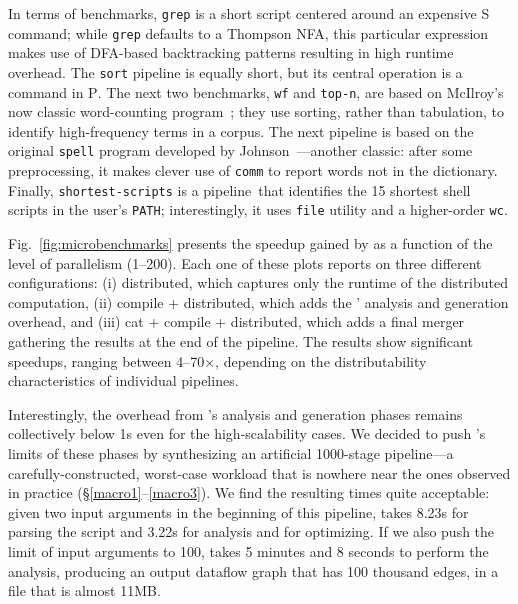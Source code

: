 \documentclass[sigplan,10pt,review,anonymous]{acmart}
\newcommand{\ttt}[1]{\texttt{\small #1}}
\newcommand{\cn}[1]{\mbox{\textcircled{\footnotesize #1}}}
\newcommand{\pur}{\cn{\textsc{P}}\xspace}
\newcommand{\sta}{\cn{\textsc{S}}\xspace}
\newcommand{\nv}[1]{[{\color{cyan}#1 --- nv}]}
\newcommand{\tr}[1]{} %
\begin{document}
In terms of benchmarks, \ttt{grep} is a short script centered around an expensive \sta command;
  while \ttt{grep} defaults to a Thompson NFA, this particular expression makes use of DFA-based backtracking patterns resulting in high runtime overhead.
The \ttt{sort} pipeline is equally short, but its central operation is a command in \pur.
The next two benchmarks, \ttt{wf} and \ttt{top-n}, are based on McIlroy's now classic word-counting program~\cite{bentley1986literate};
  they use sorting, rather than tabulation, to identify high-frequency terms in a corpus.
The next pipeline is based on the original \ttt{spell} program developed by Johnson~\cite{bentley1985spelling}---another \unix classic:
  after some preprocessing, it makes clever use of \ttt{comm} to report words not in the dictionary.
Finally, \ttt{shortest-scripts} is a pipeline~\cite[pg. 7]{taylor2004wicked}that identifies the 15 shortest shell scripts in the user's \ttt{PATH};
   interestingly, it uses \ttt{file} utility and a higher-order \ttt{wc}.

Fig.~\ref{fig:microbenchmarks} presents the speedup gained by \sys as a function of the level of parallelism (1--200).
Each one of these plots reports on three different configurations:
  (i) distributed, which captures only the runtime of the distributed computation,
  (ii) compile + distributed, which adds the \sys' analysis and generation overhead, and
  (iii) cat + compile + distributed, which adds a final merger  gathering the results at the end of the pipeline.
The results show significant speedups, ranging between 4--70$\times$, depending on the distributability characteristics of individual pipelines.

Interestingly, the overhead from \sys's analysis and generation phases remains collectively below 1s even for the high-scalability cases.
We decided to push \sys's limits of these phases by synthesizing an artificial 1000-stage pipeline---a carefully-constructed, worst-case workload that is nowhere near the ones observed in practice (\S\ref{macro1}--\ref{macro3}).
We find the resulting times quite acceptable: given two input arguments in the beginning of this pipeline, \sys takes 8.23s for parsing the script and 3.22s for analysis and for optimizing. If we also push the limit of input arguments to 100, \sys takes 5 minutes and 8 seconds to perform the analysis, producing an output dataflow graph that has 100 thousand edges, in a file that is almost 11MB.
\end{document}
